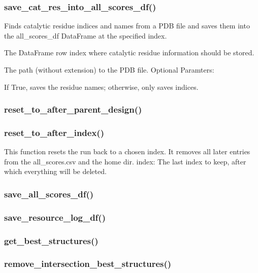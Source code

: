 \documentclass[10pt]{extarticle}
\begin{document}
\subsubsection{save\_cat\_res\_into\_all\_scores\_df()}
Finds catalytic residue indices and names from a PDB file and saves them into the all\_scores\_df DataFrame at the specified index.

\par\vspace*{0.5\baselineskip}
{
\begin{description}[noitemsep,topsep=0pt,parsep=0pt,labelwidth=5cm,leftmargin=!,labelindent=0pt,labelsep=0.2cm,itemsep=0pt]
\item[\textcolor{mpgAccentBlue!75!white}{index\dotfill}] The DataFrame row index where catalytic residue information should be stored.
\item[\textcolor{mpgAccentBlue!75!white}{PDB\_path (str)\dotfill}] The path (without extension) to the PDB file. Optional Paramters:
\item[\textcolor{mpgAccentBlue!75!white}{save\_resn (bool, optional)\dotfill}] If True, saves the residue names; otherwise, only saves indices.
\end{description}
}
\subsubsection{reset\_to\_after\_parent\_design()}
\subsubsection{reset\_to\_after\_index()}
This function resets the run back to a chosen index. It removes all later entries from the all\_scores.csv and the home dir.
index: The last index to keep, after which everything will be deleted.
\subsubsection{save\_all\_scores\_df()}
\subsubsection{save\_resource\_log\_df()}
\subsubsection{get\_best\_structures()}
\subsubsection{remove\_intersection\_best\_structures()}
\end{document}

